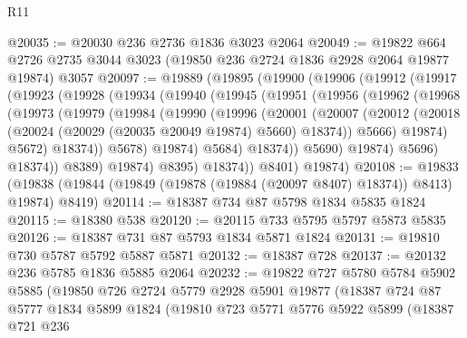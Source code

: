 \begin{lexlean}{R11}
\begin{coremodule}
@20035 := @20030 @236 @2736 @1836 @3023 @2064
@20049 := @19822
    @664
    @2726
    @2735
    @3044
    @3023
    (@19850 @236 @2724 @1836 @2928 @2064 @19877 @19874)
    @3057
@20097 := @19889
    (@19895
      (@19900
        (@19906
          (@19912
            (@19917
              (@19923
                (@19928
                  (@19934
                    (@19940
                      (@19945
                        (@19951
                          (@19956
                            (@19962
                              (@19968
                                (@19973
                                  (@19979
                                    (@19984
                                      (@19990
                                        (@19996
                                          (@20001
                                            (@20007
                                              (@20012
                                                (@20018
                                                  (@20024
                                                    (@20029 (@20035 @20049 @19874) @5660)
                                                    @18374))
                                                @5666)
                                              @19874)
                                            @5672)
                                          @18374))
                                      @5678)
                                    @19874)
                                  @5684)
                                @18374))
                            @5690)
                          @19874)
                        @5696)
                      @18374))
                  @8389)
                @19874)
              @8395)
            @18374))
        @8401)
      @19874)
@20108 := @19833
    (@19838 (@19844 (@19849 (@19878 (@19884 (@20097 @8407) @18374)) @8413) @19874) @8419)
@20114 := @18387 @734 @87 @5798 @1834 @5835 @1824
@20115 := @18380 @538
@20120 := @20115 @733 @5795 @5797 @5873 @5835
@20126 := @18387 @731 @87 @5793 @1834 @5871 @1824
@20131 := @19810 @730 @5787 @5792 @5887 @5871
@20132 := @18387 @728
@20137 := @20132 @236 @5785 @1836 @5885 @2064
@20232 := @19822
    @727
    @5780
    @5784
    @5902
    @5885
    (@19850
      @726
      @2724
      @5779
      @2928
      @5901
      @19877
      (@18387
        @724
        @87
        @5777
        @1834
        @5899
        @1824
        (@19810
          @723
          @5771
          @5776
          @5922
          @5899
          (@18387
            @721
            @236

\end{coremodule}
\end{lexlean}
